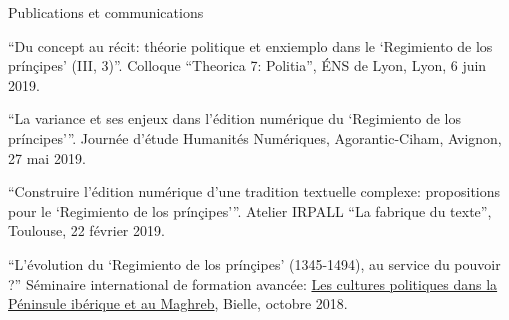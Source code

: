 \begin{rubric}{Publications et communications}
                    
                    \entry*
                 \enquote{Du concept au récit:
                        théorie politique et enxiemplo dans le
                        \enquote{Regimiento de los prínçipes} (III,
                        3)}. Colloque \enquote{Theorica 7: Politia}, ÉNS
                        de Lyon, Lyon, 6 juin 2019. 
                    
                    \entry*
                \enquote{La variance et ses enjeux dans l'édition
                        numérique du \enquote{Regimiento de los
                        príncipes}}. Journée d'étude Humanités
                        Numériques, Agorantic-Ciham, Avignon, 27
                        mai 2019.
                    
                    \entry*
                \enquote{Construire l'édition numérique d'une
                        tradition textuelle complexe: propositions pour le
                        \enquote{Regimiento de los prínçipes}}.
                        Atelier IRPALL \enquote{La fabrique du texte},
                        Toulouse, 22 février 2019.
                    
                    \entry*
                \enquote{L'évolution du \enquote{Regimiento de los
                        prínçipes} (1345-1494), au service du pouvoir
                        ?} Séminaire international de formation avancée:
                        \href{https://recherche.univ-pau.fr/fr/accueil/cpim.html}{Les cultures politiques dans la Péninsule ibérique et
                        au Maghreb}, Bielle, octobre 2018. \end{rubric}


